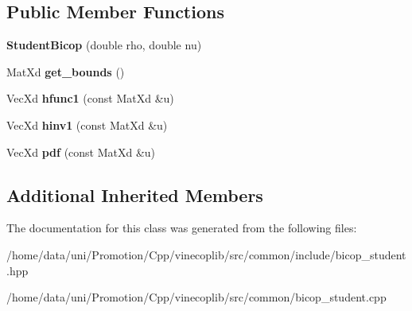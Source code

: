 \subsection*{Public Member Functions}
\begin{DoxyCompactItemize}
\item 
\hypertarget{class_student_bicop_af2f1f0ed77021f51e5a148044a677bce}{{\bfseries Student\+Bicop} (double rho, double nu)}\label{class_student_bicop_af2f1f0ed77021f51e5a148044a677bce}

\item 
\hypertarget{class_student_bicop_aa4e65db1840bc768d014468dd8bf9ca8}{Mat\+Xd {\bfseries get\+\_\+bounds} ()}\label{class_student_bicop_aa4e65db1840bc768d014468dd8bf9ca8}

\item 
\hypertarget{class_student_bicop_ab2395bfd3ff086b1d99042fdbb1cbf95}{Vec\+Xd {\bfseries hfunc1} (const Mat\+Xd \&u)}\label{class_student_bicop_ab2395bfd3ff086b1d99042fdbb1cbf95}

\item 
\hypertarget{class_student_bicop_a8d57355f160528f061e974878d4b5deb}{Vec\+Xd {\bfseries hinv1} (const Mat\+Xd \&u)}\label{class_student_bicop_a8d57355f160528f061e974878d4b5deb}

\item 
\hypertarget{class_student_bicop_a83954847188ff122f261f9a35f5971d4}{Vec\+Xd {\bfseries pdf} (const Mat\+Xd \&u)}\label{class_student_bicop_a83954847188ff122f261f9a35f5971d4}

\end{DoxyCompactItemize}
\subsection*{Additional Inherited Members}


The documentation for this class was generated from the following files\+:\begin{DoxyCompactItemize}
\item 
/home/data/uni/\+Promotion/\+Cpp/vinecoplib/src/common/include/bicop\+\_\+student.\+hpp\item 
/home/data/uni/\+Promotion/\+Cpp/vinecoplib/src/common/bicop\+\_\+student.\+cpp\end{DoxyCompactItemize}
